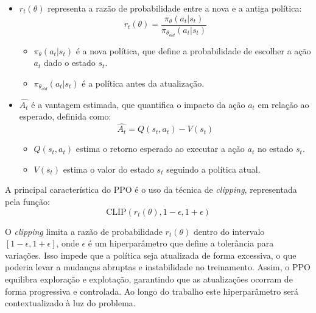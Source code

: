 \documentclass[
    12pt,                %
    openright,           %
    oneside,             %
    a4paper,             %
    english,             %
    spanish,             %
    brazil               %
]{ufscar}
\begin{document}
\begin{itemize}
    \item \( r_t(\theta) \) representa a razão de probabilidade entre a nova e a antiga política:
    \begin{equation}
    r_t(\theta) = \frac{\pi_{\theta}(a_t|s_t)}{\pi_{\theta_{old}}(a_t|s_t)}
    \end{equation}

    \begin{itemize}
        \item \( \pi_{\theta}(a_t|s_t) \) é a nova política, que define a probabilidade de escolher a ação \( a_t \) dado o estado \( s_t \).
        \item \( \pi_{\theta_{old}}(a_t|s_t) \) é a política antes da atualização.
    \end{itemize}

    \item \( \widehat{A_t} \) é a vantagem estimada, que quantifica o impacto da ação \( a_t \) em relação ao esperado, definida como:
    \begin{equation}
    \widehat{A_t} = Q(s_t, a_t) - V(s_t)
    \end{equation}

    \begin{itemize}
        \item \( Q(s_t, a_t) \) estima o retorno esperado ao executar a ação \( a_t \) no estado \( s_t \).
        \item \( V(s_t) \) estima o valor do estado \( s_t \) seguindo a política atual.
    \end{itemize}
\end{itemize}

A principal característica do PPO é o uso da técnica de \textit{clipping}, representada pela função:
\begin{equation}
\text{CLIP}\left(r_t(\theta), 1 - \epsilon, 1 + \epsilon\right)
\end{equation}

O \textit{clipping} limita a razão de probabilidade \( r_t(\theta) \) dentro do intervalo \( [1 - \epsilon, 1 + \epsilon] \), onde \( \epsilon \) é um hiperparâmetro que define a tolerância para variações. Isso impede que a política seja atualizada de forma excessiva, o que poderia levar a mudanças abruptas e instabilidade no treinamento. Assim, o PPO equilibra exploração e explotação, garantindo que as atualizações ocorram de forma progressiva e controlada. Ao longo do trabalho este hiperparâmetro será contextualizado à luz do problema.
\end{document}
